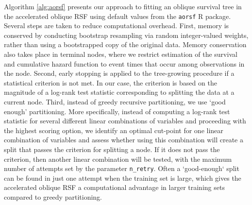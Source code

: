 \documentclass[12pt]{article}\usepackage[]{graphicx}\usepackage[]{xcolor}
\begin{document}
Algorithm \ref{alg:aorsf} presents our approach to fitting an oblique survival tree in the accelerated oblique RSF using default values from the \texttt{aorsf} R package. Several steps are taken to reduce computational overhead. First, memory is conserved by conducting bootstrap resampling via random integer-valued weights, rather than using a bootstrapped copy of the original data. Memory conservation also takes place in terminal nodes, where we restrict estimation of the survival and cumulative hazard function to event times that occur among observations in the node. Second, early stopping is applied to the tree-growing procedure if a statistical criterion is not met. In our case, the criterion is based on the magnitude of a log-rank test statistic corresponding to splitting the data at a current node. Third, instead of greedy recursive partitioning, we use `good enough' partitioning. More specifically, instead of computing a log-rank test statistic for several different linear combinations of variables and proceeding with the highest scoring option, we identify an optimal cut-point for one linear combination of variables and assess whether using this combination will create a split that passes the criterion for splitting a node. If it does not pass the criterion, then another linear combination will be tested, with the maximum number of attempts set by the parameter \texttt{n\_retry}. Often a `good-enough` split can be found in just one attempt when the training set is large, which gives the accelerated oblique RSF a computational advantage in larger training sets compared to greedy partitioning.
\end{document}
